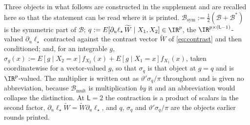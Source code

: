 Three objects in what follows are constructed in the supplement and are
recalled here so that the statement can be read where it is printed.
$\mathcal B_{\mathrm{sym}}:=\tfrac12(\mathcal B+\mathcal B^{\ast})$ is the
symmetric part of $\mathcal B$; $q:=E[\partial_u\ell_\star\,\widetilde W\mid
X_1,X_2]\in\IR^{p}$, the $\IR^{p\times(\mathsf L-1)}$-valued $\partial_u\ell_\star$
contracted against the contrast vector $\widetilde W$ of \eqref{eq:contrast} and then
conditioned; and, for an integrable $g$, $\sigma_g(x):=E[g\mid X_2=x]f_{X_2}(x)
+E[g\mid X_1=x]f_{X_1}(x)$, taken coordinatewise for a vector-valued $g$, so that
$\sigma_q$ is that object at $g=q$ and is $\IR^{p}$-valued. The
multiplier is written out as $\vartheta'\sigma_q/\pi$ throughout and is given no
abbreviation, because $\mathcal B_{\mathrm{mult}}$ is multiplication \emph{by} it
and an abbreviation would collapse the distinction.
At $\mathsf L=2$ the contraction is a product of scalars in the second factor,
$\partial_u\ell_\star\widetilde W=\widetilde W\partial_u\ell_\star$, and $q$, $\sigma_q$ and
$\vartheta'\sigma_q/\pi$ are the objects earlier rounds printed.

